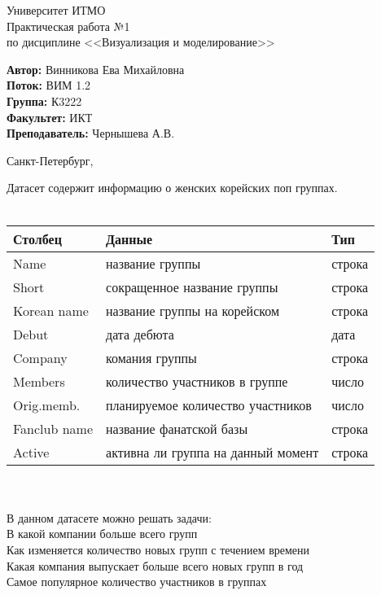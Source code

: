 \documentclass[12pt,a4paper]{article}
\begin{document}
	
\begin{titlepage}
	
\begin{center}
	\large Университет ИТМО\\[5cm]
	\LARGE Практическая работа №1\\
	\normalsize по дисциплине <<Визуализация и моделирование>>\\[5cm]
\end{center}
\begin{flushright}
		\begin{minipage}{0.6\textwidth}
		\begin{flushleft}
			\large
			\singlespacing 
			\textbf{Автор:} Винникова Ева Михайловна\\
			\textbf{Поток:} ВИМ 1.2\\
			\textbf{Группа:} К3222\\
			\textbf{Факультет:} ИКТ\\
			\textbf{Преподаватель:} Чернышева А.В.
		\end{flushleft}
	\end{minipage}
\end{flushright}

\vfill

\begin{center}
	{\large Санкт-Петербург, \the{}}
\end{center}
 
\end{titlepage}
\normalsize


Датасет содержит информацию о женских корейских поп группах.\\
\\
\begin{tabular}{ | l | l | l | }
\hline
Столбец & Данные & Тип \\ \hline
Name & название группы & строка \\
Short & сокращенное название группы & строка \\
Korean name & название группы на корейском & строка \\
Debut & дата дебюта & дата \\
Company & комания группы & строка \\
Members & количество участников в группе & число \\
Orig.memb. & планируемое количество участников & число \\
Fanclub name & название фанатской базы & строка \\
Active & активна ли группа на данный момент & строка \\
\hline
\end{tabular}
\\
\\В данном датасете можно решать задачи:\\
В какой компании больше всего групп\\
Как изменяется количество новых групп с течением времени \\
Какая компания выпускает больше всего новых групп в год\\
Самое популярное количество участников в группах
\end{document}
